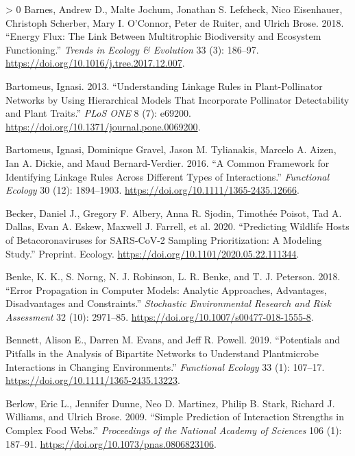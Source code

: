 \documentclass[10pt,oneside]{article}
\newlength{\cslhangindent}
\newenvironment{CSLReferences}[3] %
 {%
  \setlength{\parindent}{0pt}
  \ifodd #1 \everypar{\setlength{\hangindent}{\cslhangindent}}\ignorespaces\fi
  \ifnum #2 > 0
  \setlength{\parskip}{#2\baselineskip}
  \fi
 }%
 {}
\begin{document}
\begin{CSLReferences}{1}{0}
\leavevmode\hypertarget{ref-Barnes2018EneFlu}{}%
Barnes, Andrew D., Malte Jochum, Jonathan S. Lefcheck, Nico Eisenhauer,
Christoph Scherber, Mary I. O'Connor, Peter de Ruiter, and Ulrich Brose.
2018. {``Energy Flux: The Link Between Multitrophic Biodiversity and
Ecosystem Functioning.''} \emph{Trends in Ecology \& Evolution} 33 (3):
186--97. \url{https://doi.org/10.1016/j.tree.2017.12.007}.

\leavevmode\hypertarget{ref-Bartomeus2013UndLin}{}%
Bartomeus, Ignasi. 2013. {``Understanding Linkage Rules in
Plant-Pollinator Networks by Using Hierarchical Models That Incorporate
Pollinator Detectability and Plant Traits.''} \emph{PLoS ONE} 8 (7):
e69200. \url{https://doi.org/10.1371/journal.pone.0069200}.

\leavevmode\hypertarget{ref-Bartomeus2016ComFra}{}%
Bartomeus, Ignasi, Dominique Gravel, Jason M. Tylianakis, Marcelo A.
Aizen, Ian A. Dickie, and Maud Bernard-Verdier. 2016. {``A Common
Framework for Identifying Linkage Rules Across Different Types of
Interactions.''} \emph{Functional Ecology} 30 (12): 1894--1903.
\url{https://doi.org/10.1111/1365-2435.12666}.

\leavevmode\hypertarget{ref-Becker2020PreWil}{}%
Becker, Daniel J., Gregory F. Albery, Anna R. Sjodin, Timothée Poisot,
Tad A. Dallas, Evan A. Eskew, Maxwell J. Farrell, et al. 2020.
{``Predicting Wildlife Hosts of Betacoronaviruses for SARS-CoV-2
Sampling Prioritization: A Modeling Study.''} Preprint. Ecology.
\url{https://doi.org/10.1101/2020.05.22.111344}.

\leavevmode\hypertarget{ref-Benke2018ErrPro}{}%
Benke, K. K., S. Norng, N. J. Robinson, L. R. Benke, and T. J. Peterson.
2018. {``Error Propagation in Computer Models: Analytic Approaches,
Advantages, Disadvantages and Constraints.''} \emph{Stochastic
Environmental Research and Risk Assessment} 32 (10): 2971--85.
\url{https://doi.org/10.1007/s00477-018-1555-8}.

\leavevmode\hypertarget{ref-Bennett2019PotPit}{}%
Bennett, Alison E., Darren M. Evans, and Jeff R. Powell. 2019.
{``Potentials and Pitfalls in the Analysis of Bipartite Networks to
Understand Plantmicrobe Interactions in Changing Environments.''}
\emph{Functional Ecology} 33 (1): 107--17.
\url{https://doi.org/10.1111/1365-2435.13223}.

\leavevmode\hypertarget{ref-Berlow2009SimPre}{}%
Berlow, Eric L., Jennifer Dunne, Neo D. Martinez, Philip B. Stark,
Richard J. Williams, and Ulrich Brose. 2009. {``Simple Prediction of
Interaction Strengths in Complex Food Webs.''} \emph{Proceedings of the
National Academy of Sciences} 106 (1): 187--91.
\url{https://doi.org/10.1073/pnas.0806823106}.


\end{CSLReferences}
\end{document}

